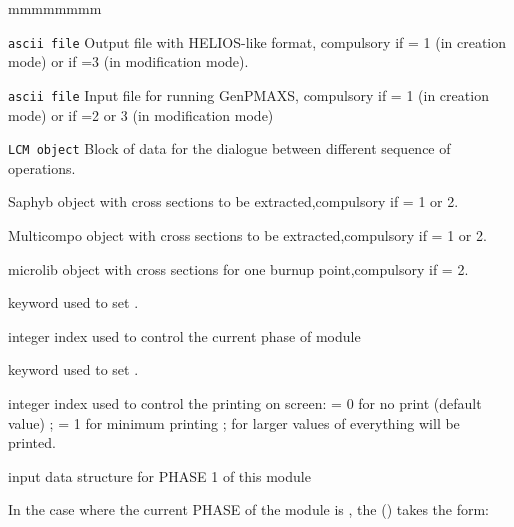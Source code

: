 \begin{ListeDeDescription}{mmmmmmmm}
\item[\dusa{HEL}] \texttt{ascii file} Output file with HELIOS-like format, compulsory if  = 1 (in creation mode) or if =3 (in modification mode).

\item[\dusa{GEN}] \texttt{ascii file} Input file for running GenPMAXS,  compulsory if  = 1 (in creation mode) or if =2 or 3 (in modification mode)

\item[\dusa{INF}]\texttt{LCM object} Block of data for the dialogue between different sequence of operations.

\item[\dusa{SAP}] Saphyb object with cross sections to be extracted,compulsory if  = 1 or 2.

\item[\dusa{MCO}] Multicompo object with cross sections to be extracted,compulsory if  = 1 or 2.

\item[\dusa{MIC}] microlib object with cross sections for one burnup point,compulsory if  = 2.

\item[\moc{PHASE}] keyword used to set .

\item[\dusa{iph}]integer index used to control the current phase of  module

\item[\moc{EDIT}] keyword used to set .

\item[\dusa{iprint}] integer index used to control the printing on screen:
 = 0 for no print (default value) ; = 1 for minimum printing ; for larger values of
 everything will be printed.

\item[\moc{(\textbf{descphase1})}] input data structure for PHASE 1 of this module
\end{ListeDeDescription}

\vskip 0.08cm

In the case where the current PHASE of the  module is , the () takes the form:

